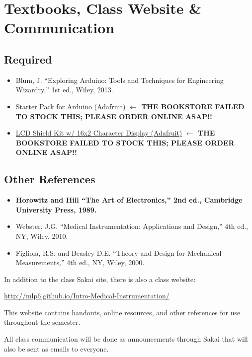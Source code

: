 \section{Textbooks, Class Website \& Communication}

\subsection{Required}
\begin{itemize}
    \item Blum, J. ``Exploring Arduino: Tools and Techniques for Engineering
        Wizardry,'' 1st ed., Wiley, 2013.
    \item \href{http://www.adafruit.com/products/68}{Starter Pack for Arduino (Adafruit)} \textbf{$\leftarrow$ THE BOOKSTORE FAILED TO STOCK THIS; PLEASE ORDER ONLINE ASAP!!}
    \item \href{http://www.adafruit.com/products/772}{LCD Shield Kit w/ 16x2 Character Display (Adafruit)} \textbf{$\leftarrow$ THE BOOKSTORE FAILED TO STOCK THIS; PLEASE ORDER ONLINE ASAP!!}

\end{itemize}


\subsection{Other References}
\begin{itemize}
\item \textbf{Horowitz and Hill ``The Art of Electronics,'' 2nd ed., Cambridge
University Press, 1989.}
\item Webster, J.G. ``Medical Instrumentation: Applications and Design,'' 4th
ed., NY, Wiley, 2010.
\item Figliola, R.S. and Beasley D.E. ``Theory and Design for Mechanical
Measurements,'' 4th ed., NY, Wiley, 2000.
\end{itemize}

In addition to the class Sakai site, there is also a class website:\\

\centerline{\url{http://mlp6.github.io/Intro-Medical-Instrumentation/}}

This website contains handouts, online resources, and other references for use
throughout the semester.

All class communication will be done as announcements through Sakai that will
also be sent as emails to everyone.
